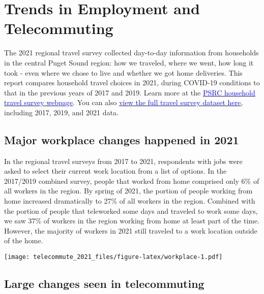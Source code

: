 \documentclass[
  12pt,
]{article}
\author{}
\date{\vspace{-2.5em}}
\begin{document}
\setmainfont{Poppins}

\hypertarget{trends-in-employment-and-telecommuting}{%
\section{Trends in Employment and
Telecommuting}\label{trends-in-employment-and-telecommuting}}

\begin{flushleft}
The 2021 regional travel survey collected day-to-day information from households in the central Puget Sound region: how we traveled, where we went, how long it took - even where we chose to live and whether we got home deliveries. This report compares household travel choices in 2021, during COVID-19 conditions to that in the previous years of 2017 and 2019. Learn more at the \href{https://www.psrc.org/our-work/household-travel-survey-program}{\underline{\textcolor{blue}{PSRC household travel survey webpage}}}. You can also \href{https://household-travel-survey-psregcncl.hub.arcgis.com}{\underline{\textcolor{blue}{view the full travel survey dataset here}}}, including 2017, 2019, and 2021 data.
\end{flushleft}

\hypertarget{major-workplace-changes-happened-in-2021}{%
\subsection{Major workplace changes happened in
2021}\label{major-workplace-changes-happened-in-2021}}

\begin{flushleft}
In the regional travel surveys from 2017 to 2021, respondents with jobs were asked to select their current work location from a list of options. In the 2017/2019 combined survey, people that worked from home comprised only 6\% of all workers in the region. By spring of 2021, the portion of people working from home increased dramatically to 27\% of all workers in the region. Combined with the portion of people that teleworked some days and traveled to work some days, we saw 37\% of workers in the region working from home at least part of the time. However, the majority of workers in 2021 still traveled to a work location outside of the home.
\end{flushleft}

\texttt{[image: telecommute\_2021\_files/figure-latex/workplace-1.pdf]}

\hypertarget{large-changes-seen-in-telecommuting}{%
\subsection{Large changes seen in
telecommuting}\label{large-changes-seen-in-telecommuting}}
\end{document}
